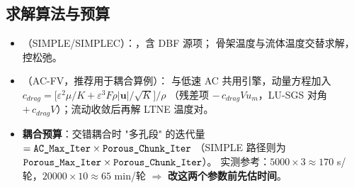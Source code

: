\subsection{求解算法与预算}
\begin{itemize}
  \item {}（SIMPLE/SIMPLEC）：，含 DBF 源项；
        骨架温度与流体温度交替求解， 控松弛。
  \item {}（AC-FV，推荐用于耦合算例）：
        与低速 AC 共用引擎，动量方程加入
        $c_{drag}=\bigl[\varepsilon^2\mu/K+\varepsilon^3F\rho\lvert\mathbf{u}\rvert/\sqrt{K}\bigr]/\rho$
        （残差项 $-\,c_{drag}V u_m$，LU-SGS 对角 $+\,c_{drag}V$）；流动收敛后再解 LTNE 温度对。
  \item \textbf{耦合预算}：交错耦合时 "多孔段" 的迭代量
        $= \texttt{AC\_Max\_Iter}\times\texttt{Porous\_Chunk\_Iter}$
        （SIMPLE 路径则为 $\texttt{Porous\_Max\_Iter}\times\texttt{Porous\_Chunk\_Iter}$）。
        实测参考：$5000\times3\approx170$ s/轮，$20000\times10\approx65$ min/轮
        $\Rightarrow$ \textbf{改这两个参数前先估时间}。
\end{itemize}


